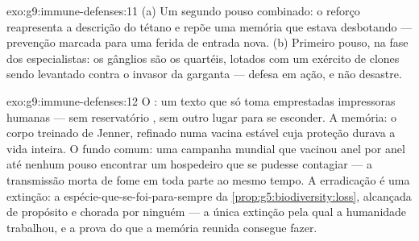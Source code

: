 \begin{solution}{exo:g9:immune-defenses:11}
(a) Um segundo pouso combinado: o reforço reapresenta a
descrição do tétano e repõe uma memória que estava desbotando
--- prevenção marcada para uma ferida de entrada nova. (b)
Primeiro pouso, na fase dos especialistas: os gânglios são os
quartéis, lotados com um exército de clones sendo levantado
contra o invasor da garganta --- defesa em ação, e não
desastre.
\end{solution}

\begin{solution}{exo:g9:immune-defenses:12}
O : um texto que só toma emprestadas impressoras
humanas --- sem reservatório , sem outro lugar para se
esconder. A memória: o corpo treinado de Jenner, refinado
numa vacina estável cuja proteção durava a vida inteira. O
fundo comum: uma campanha mundial que vacinou anel por anel
até nenhum pouso encontrar um hospedeiro que se pudesse
contagiar --- a transmissão morta de fome em toda parte ao
mesmo tempo. A erradicação é uma extinção: a
espécie-que-se-foi-para-sempre da
\cref{prop:g5:biodiversity:loss}, alcançada de propósito e
chorada por ninguém --- a única extinção pela qual a
humanidade trabalhou, e a prova do que a memória reunida
consegue fazer.
\end{solution}

